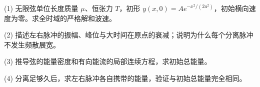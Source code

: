 (1) 无限弦单位长度质量 \(\mu\)、恒张力 \(T\)，初形 \(y(x,0)=A e^{-x^2/(2a^2)}\)，初始横向速度为零。求全时域的严格解和波速。

(2) 描述左右脉冲的振幅、峰位与大时间在原点的衰减；说明为什么每个分离脉冲不发生频散展宽。

(3) 推导弦的能量密度和有向能流的局部连续方程，求初始总能量。

(4) 分离足够久后，求左右脉冲各自携带的能量，验证与初始总能量完全相同。
